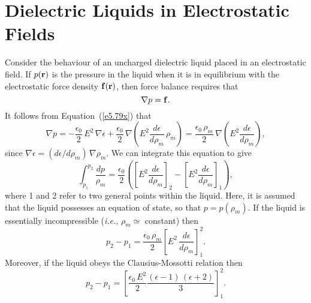 \section{Dielectric Liquids in Electrostatic Fields}
Consider the behaviour of an uncharged dielectric liquid placed in
an electrostatic field. If $p({\bf r})$ is the pressure in the liquid when it is
in equilibrium with the electrostatic force density ${\bf f}({\bf r})$, then
force balance requires  that
\begin{equation}\label{e5.94x}
\nabla p = {\bf f}.
\end{equation}
It follows from Equation~(\ref{e5.79x}) that
\begin{equation}
\nabla p = - \frac{\epsilon_0}{2} \,E^2\,\nabla\epsilon
+ \frac{\epsilon_0}{2} \,\nabla\!\left(E^2 \frac{d\epsilon}{d\rho_m}\,\rho_m
\right)= \frac{\epsilon_0\,\rho_m}{2}\, \nabla\!\left(E^2 \frac{d\epsilon}{d\rho_m}
\right),
\end{equation}
since $\nabla \epsilon = (d\epsilon/d\rho_m)\,\nabla\rho_m$. 
We can integrate  this  equation to  give
\begin{equation}
\int_{p_1}^{p_2} \frac{dp}{\rho_m} =\frac{\epsilon_0}{2}
\left(\left[E^2\frac{d\epsilon}{d\rho_m}\right]_2 - 
\left[E^2\frac{d\epsilon}{d\rho_m}\right]_1\right),
\end{equation}
where 1 and 2 refer to two general points within the liquid. Here, it is
assumed that the liquid possesses an equation of state, so that
$p=p(\rho_m)$. If the liquid is essentially incompressible
({\em i.e.}, $\rho_m\simeq$ constant) then 
\begin{equation}
p_2 - p_1 = \frac{\epsilon_0\,\rho_m}{2} \left[E^2\,\frac{d\epsilon}{d\rho_m}
\right]_1^2.
\end{equation}
Moreover, if the liquid obeys the Clausius-Mossotti relation then
\begin{equation}\label{e5.98x}
p_2 - p_1 = \left[ \frac{\epsilon_0\, E^2}{2} \frac{(\epsilon-1)\,(\epsilon+2)}{3}
\right]_{1}^2.
\end{equation}

